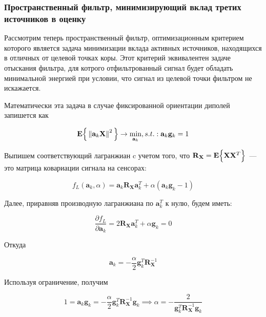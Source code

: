 \subsubsection{Пространственный фильтр, минимизирующий вклад третих источников в оценку}\label{sec:min_interference_filter}

Рассмотрим теперь пространственный фильтр,
оптимизационным критерием которого является задача минимизации
вклада активных источников, находящихся в отличных от целевой точках коры.
Этот критерий эквивалентен задаче отыскания фильтра, для котрого отфильтрованный
сигнал будет обладать минимальной энергией при условии, что
сигнал из целевой точки фильтром не искажается.

Математически эта задача в случае фиксированной ориентации диполей запишется как

\begin{equation}
    \mathbf{E}\Big\{\left\lVert\mathbf{a}_k \mathbf{X}\right\rVert^2\Big\}
    \rightarrow \underset{\mathbf{a}_k}{\min},
    s.t.: \mathbf{a}_k \mathbf{g}_k = 1
    \label{lcmv_objective_nonreg}
\end{equation}

Выпишем соответствующий лагранжиан c учетом того,
что $\mathbf{R}_{\mathbf{X}} = \mathbf{E}\Big\{\mathbf{X}\mathbf{X}^T\Big\}$~---
это матрица ковариации сигнала на сенсорах:

\begin{equation}
    f_L(\mathbf{a}_k, \alpha) = \mathbf{a}_k \mathbf{R}_{\mathbf{X}} \mathbf{a}_k^T +
                                 \alpha (\mathbf{a}_k \mathbf{g}_k - 1)
\end{equation}


Далее, приравняв производную лагранжиана по $\mathbf{a}_k ^ T$ к нулю, будем иметь:

\begin{equation}
    \frac{\partial f_L}{\partial \mathbf{a}_k} = 
    2 \mathbf{R}_{\mathbf{X}} \mathbf{a}_k^T + \alpha \mathbf{g}_k = 0
\end{equation}

Откуда

\begin{equation}
    \mathbf{a}_k = - \frac{\alpha}{2} \mathbf{g}_k^T\mathbf{R}_{\mathbf{X}}^{-1}
\end{equation}

Используя ограничение, получим

\begin{equation}
    1 = \mathbf{a}_k \mathbf{g}_k =
    - \frac{\alpha}{2} \mathbf{g}_k^T\mathbf{R}_{\mathbf{X}}^{-1} \mathbf{g}_k \implies
    \alpha = -\frac{2}{\mathbf{g}_k^T \mathbf{R}_{\mathbf{X}}^{-1} \mathbf{g}_k}
\end{equation}

